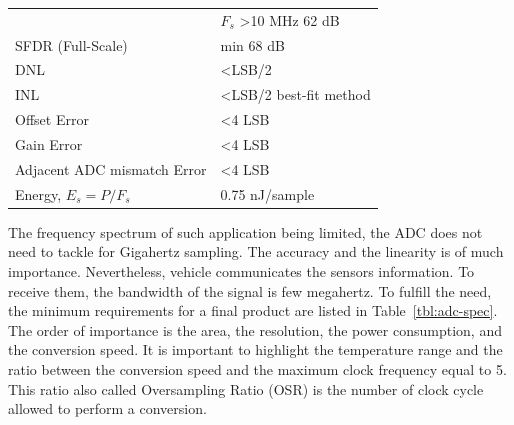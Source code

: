 \begin{table}[htp]
\begin{tabular}{ll}
    \rowcolor{white}\multirow{-3}{*}{SNDR } & $F_s$  \textgreater 10 MHz 62 dB \\
    SFDR (Full-Scale)                & min 68 dB                                                                                                                                                   \\
    DNL                              & \textless LSB/2                                                                                                                                             \\
    INL                              & \textless LSB/2 best-fit method                                                                                                                             \\
    Offset Error                     & \textless 4 LSB                                                                                                                                             \\
    Gain Error                       & \textless 4 LSB                                                                                                                                             \\
    Adjacent ADC mismatch Error      & \textless 4 LSB                                                                                                                                             \\
    Energy, $E_s = P/F_s$            & 0.75 nJ/sample      \\ \bottomrule                                                                                                                                       
    \end{tabular}
\end{table}

The frequency spectrum of such application being limited, the ADC does not need to tackle for Gigahertz sampling. The accuracy and the linearity is of much importance. Nevertheless, vehicle communicates the sensors information. To receive them, the bandwidth of the signal is few megahertz.
To fulfill the need, the minimum requirements for a final product are listed in Table~\ref{tbl:adc-spec}. The order of importance is the area, the resolution, the power consumption, and the conversion speed. It is important to highlight the temperature range and the ratio between the conversion speed and the maximum clock frequency equal to 5. This ratio also called Oversampling Ratio (OSR) is the number of clock cycle allowed to perform a conversion.

